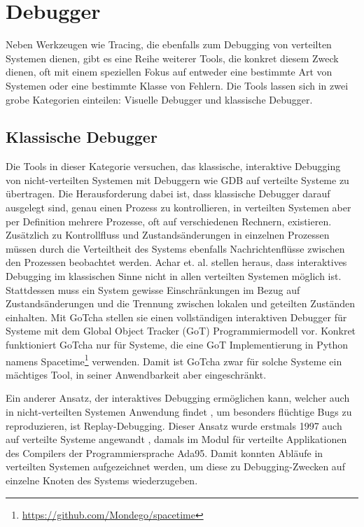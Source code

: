 \documentclass[12pt,a4paper]{report}
\begin{document}
\section{Debugger}
Neben Werkzeugen wie Tracing, die ebenfalls zum Debugging von verteilten Systemen dienen, gibt es eine Reihe weiterer Tools, die
konkret diesem Zweck dienen, oft mit einem speziellen Fokus auf entweder eine bestimmte Art von Systemen oder eine bestimmte
Klasse von Fehlern. Die Tools lassen sich in zwei grobe Kategorien einteilen: Visuelle Debugger und klassische Debugger.

\subsection{Klassische Debugger}
Die Tools in dieser Kategorie versuchen, das klassische, interaktive Debugging von nicht-verteilten Systemen mit Debuggern wie GDB
auf verteilte Systeme zu übertragen. Die Herausforderung dabei ist, dass klassische Debugger darauf ausgelegt sind, genau einen
Prozess zu kontrollieren, in verteilten Systemen aber per Definition mehrere Prozesse, oft auf verschiedenen Rechnern, existieren.
Zusätzlich zu Kontrollfluss und Zustandsänderungen in einzelnen Prozessen müssen durch die Verteiltheit des Systems ebenfalls
Nachrichtenflüsse zwischen den Prozessen beobachtet werden. Achar et. al. \cite{gotcha_interactive_debugger} stellen heraus, dass
interaktives Debugging im klassischen Sinne nicht in allen verteilten Systemen möglich ist. Stattdessen muss ein
System gewisse Einschränkungen im Bezug auf Zustandsänderungen und die Trennung zwischen lokalen und geteilten Zuständen
einhalten. Mit GoTcha \cite{gotcha_interactive_debugger} stellen sie einen vollständigen interaktiven Debugger für Systeme mit dem
Global Object Tracker (GoT) Programmiermodell vor. Konkret funktioniert GoTcha nur für Systeme, die eine GoT Implementierung in
Python namens Spacetime\footnote{\url{https://github.com/Mondego/spacetime}} verwenden. Damit ist GoTcha zwar für solche Systeme
ein mächtiges Tool, in seiner Anwendbarkeit aber eingeschränkt.

Ein anderer Ansatz, der interaktives Debugging ermöglichen kann, welcher auch in nicht-verteilten Systemen Anwendung findet
\cite{normal_record_and_replay}, um besonders flüch\-tige Bugs zu reproduzieren, ist Replay-Debugging. Dieser Ansatz wurde erstmals
1997 auch auf verteilte Systeme angewandt \cite{distributed_replay_debugging_1997}, damals im Modul für verteilte
Applikationen des Compilers der Programmiersprache Ada95. Damit konnten Abläufe in verteilten Systemen aufgezeichnet werden, um
diese zu Debugging-Zwecken auf einzelne Knoten des Systems wiederzugeben.
\end{document}
